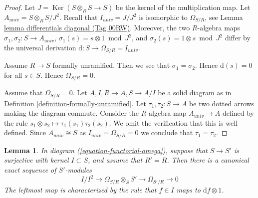 \documentclass{amsart}
\theoremstyle{plain}
\newtheorem{lemma}[subsection]{Lemma}
\theoremstyle{definition}
\theoremstyle{remark}
\numberwithin{equation}{subsection}
\def\Ker{\mathop{\mathrm{Ker}}}
\begin{document}
\begin{proof}
Let $J = \Ker(S \otimes_R S \to S)$ be the kernel of
the multiplication map. Let $A_{univ} = S \otimes_R S/J^2$. Recall
that $I_{univ} = J/J^2$ is isomorphic to $\Omega_{S/R}$, see
Lemma \href{https://stacks.math.columbia.edu/tag/00RW}{lemma differentials diagonal (Tag 00RW)}. Moreover, the two $R$-algebra maps
$\sigma_1, \sigma_2 : S \to A_{univ}$, $\sigma_1(s) = s \otimes 1 \bmod J^2$,
and $\sigma_2(s) = 1 \otimes s \bmod J^2$ differ by the
universal derivation $\text{d} : S \to \Omega_{S/R} = I_{univ}$.

\medskip\noindent
Assume $R \to S$ formally unramified.
Then we see that $\sigma_1 = \sigma_2$.
Hence $\text{d}(s) = 0$ for all $s \in S$.
Hence $\Omega_{S/R} = 0$.

\medskip\noindent
Assume that $\Omega_{S/R} = 0$. Let $A, I, R \to A, S \to A/I$
be a solid diagram as in Definition \ref{definition-formally-unramified}.
Let $\tau_1, \tau_2 : S \to A$ be two dotted arrows making the
diagram commute. Consider the $R$-algebra map $A_{univ} \to A$
defined by the rule $s_1 \otimes s_2 \mapsto \tau_1(s_1)\tau_2(s_2)$.
We omit the verification that this is well defined. Since $A_{univ} \cong S$
as $I_{univ} = \Omega_{S/R} = 0$ we conclude that $\tau_1 = \tau_2$.
\end{proof}


\begin{lemma}
\label{lemma-differential-seq}
In diagram (\ref{equation-functorial-omega}),
suppose that $S \to S'$ is surjective with kernel $I \subset S$,
and assume that $R' = R$.
Then there is a canonical exact sequence of $S'$-modules
$$
I/I^2
\longrightarrow
\Omega_{S/R} \otimes_S S'
\longrightarrow
\Omega_{S'/R}
\longrightarrow
0
$$
The leftmost map is characterized by the rule that
$f \in I$ maps to $\text{d}f \otimes 1$.
\end{lemma}
\end{document}
